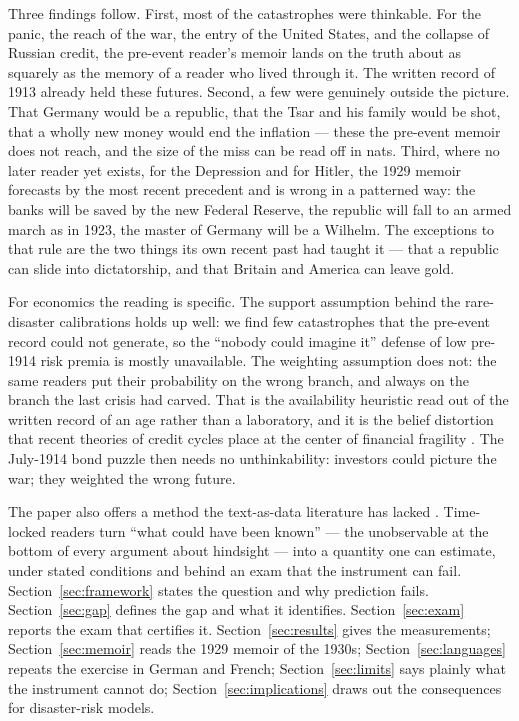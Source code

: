 \documentclass[11pt]{article}
\begin{document}
Three findings follow. First, most of the catastrophes were thinkable. For the panic, the reach of the
war, the entry of the United States, and the collapse of Russian credit, the pre-event reader's memoir
lands on the truth about as squarely as the memory of a reader who lived through it. The written record of
1913 already held these futures. Second, a few were genuinely outside the picture. That Germany would be a
republic, that the Tsar and his family would be shot, that a wholly new money would end the inflation ---
these the pre-event memoir does not reach, and the size of the miss can be read off in nats. Third, where
no later reader yet exists, for the Depression and for Hitler, the 1929 memoir forecasts by the most recent
precedent and is wrong in a patterned way: the banks will be saved by the new Federal Reserve, the republic
will fall to an armed march as in 1923, the master of Germany will be a Wilhelm. The exceptions to that
rule are the two things its own recent past had taught it --- that a republic can slide into dictatorship,
and that Britain and America can leave gold.

For economics the reading is specific. The support assumption behind the rare-disaster calibrations holds
up well: we find few catastrophes that the pre-event record could not generate, so the ``nobody could
imagine it'' defense of low pre-1914 risk premia is mostly unavailable. The weighting assumption does not:
the same readers put their probability on the wrong branch, and always on the branch the last crisis had
carved. That is the availability heuristic \citep{tversky1973} read out of the written record of an age
rather than a laboratory, and it is the belief distortion that recent theories of credit cycles place at
the center of financial fragility \citep{bordalo2018,gennaioli2018}. The July-1914 bond puzzle then needs
no unthinkability: investors could picture the war; they weighted the wrong future.

The paper also offers a method the text-as-data literature has lacked \citep{gentzkow2019}. Time-locked
readers turn ``what could have been known'' --- the unobservable at the bottom of every argument about
hindsight \citep{kuran1991,tetlock2005,taleb2007} --- into a quantity one can estimate, under stated
conditions and behind an exam that the instrument can fail. Section~\ref{sec:framework} states the question
and why prediction fails. Section~\ref{sec:gap} defines the gap and what it identifies.
Section~\ref{sec:exam} reports the exam that certifies it. Section~\ref{sec:results} gives the
measurements; Section~\ref{sec:memoir} reads the 1929 memoir of the 1930s; Section~\ref{sec:languages}
repeats the exercise in German and French; Section~\ref{sec:limits} says plainly what the instrument cannot
do; Section~\ref{sec:implications} draws out the consequences for disaster-risk models.
\end{document}
